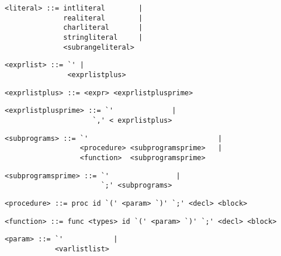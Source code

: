 \begin{footnotesize}
\begin{lstlisting}[frame=single, label={literal}, language=pie]
<literal> ::= intliteral        | 
              realiteral        | 
              charliteral       |
              stringliteral     |
              <subrangeliteral>
\end{lstlisting}

\begin{lstlisting}[frame=single, label={exprlist}, language=pie]
<exprlist> ::= `' | 
               <exprlistplus>
\end{lstlisting}

\begin{lstlisting}[frame=single, label={exprlistplus}, language=pie]
<exprlistplus> ::= <expr> <exprlistplusprime> 
\end{lstlisting}

\begin{lstlisting}[frame=single, label={exprlistplusprime}, language=pie]
<exprlistplusprime> ::= `'              |
                     `,' < exprlistplus> 
\end{lstlisting}

\begin{lstlisting}[frame=single, label={subprograms}, language=pie]
<subprograms> ::= `'                               |
                  <procedure> <subprogramsprime>   |
                  <function>  <subprogramsprime>
\end{lstlisting}

\begin{lstlisting}[frame=single, label={subprogramsprime}, language=pie]
<subprogramsprime> ::= `'                |
                       `;' <subprograms>
\end{lstlisting}

\begin{lstlisting}[frame=single, label={procedure}, language=pie]
<procedure> ::= proc id `(' <param> `)' `;' <decl> <block> 
\end{lstlisting}

\begin{lstlisting}[frame=single, label={function}, language=pie]
<function> ::= func <types> id `(' <param> `)' `;' <decl> <block>
\end{lstlisting}

\begin{lstlisting}[frame=single, label={param}, language=pie]
<param> ::= `'            |
            <varlistlist>
\end{lstlisting}


\end{footnotesize}
